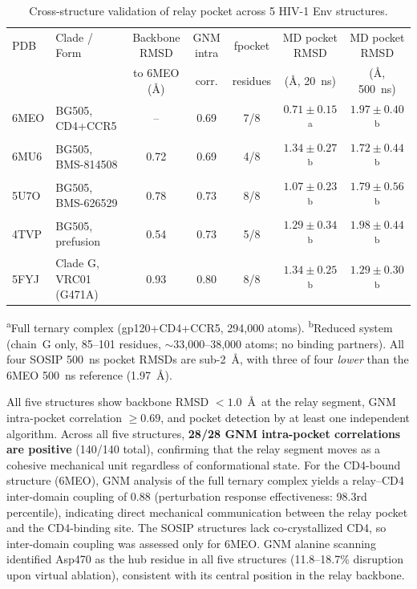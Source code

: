 \documentclass[11pt,a4paper]{article}
\begin{document}
\begin{table}[htbp]
\centering
\caption{Cross-structure validation of relay pocket across 5 HIV-1 Env structures.}
\label{tab:crossval}
\footnotesize
\begin{tabularx}{\textwidth}{@{}l >{\raggedright\arraybackslash}X ccccc@{}}
\toprule
PDB & Clade / Form & Backbone RMSD & GNM intra & fpocket & MD pocket RMSD & MD pocket RMSD \\
& & to 6MEO (\AA) & corr. & residues & (\AA, 20~ns) & (\AA, 500~ns) \\
\midrule
6MEO & BG505, CD4+CCR5 & -- & 0.69 & 7/8 & $0.71 \pm 0.15$\textsuperscript{a} & $1.97 \pm 0.40$\textsuperscript{b} \\
6MU6 & BG505, BMS-814508 & 0.72 & 0.69 & 4/8 & $1.34 \pm 0.27$\textsuperscript{b} & $\mathbf{1.72 \pm 0.44}$\textsuperscript{b} \\
5U7O & BG505, BMS-626529 & 0.78 & 0.73 & 8/8 & $1.07 \pm 0.23$\textsuperscript{b} & $1.79 \pm 0.56$\textsuperscript{b} \\
4TVP & BG505, prefusion & 0.54 & 0.73 & 5/8 & $1.29 \pm 0.34$\textsuperscript{b} & $\mathbf{1.98 \pm 0.44}$\textsuperscript{b} \\
5FYJ & Clade G, VRC01 (G471A) & 0.93 & 0.80 & 8/8 & $1.34 \pm 0.25$\textsuperscript{b} & $\mathbf{1.29 \pm 0.30}$\textsuperscript{b} \\
\bottomrule
\end{tabularx}

\vspace{0.5em}
{\footnotesize \textsuperscript{a}Full ternary complex (gp120+CD4+CCR5, 294,000 atoms). \textsuperscript{b}Reduced system (chain~G only, 85--101 residues, ${\sim}$33,000--38,000 atoms; no binding partners). All four SOSIP 500~ns pocket RMSDs are sub-2~\AA, with three of four \textit{lower} than the 6MEO 500~ns reference (1.97~\AA).}
\end{table}

All five structures show backbone RMSD $<1.0$~\AA\ at the relay segment, GNM intra-pocket correlation $\geq 0.69$, and pocket detection by at least one independent algorithm. Across all five structures, \textbf{28/28 GNM intra-pocket correlations are positive} (140/140 total), confirming that the relay segment moves as a cohesive mechanical unit regardless of conformational state. For the CD4-bound structure (6MEO), GNM analysis of the full ternary complex yields a relay--CD4 inter-domain coupling of 0.88 (perturbation response effectiveness: 98.3rd percentile), indicating direct mechanical communication between the relay pocket and the CD4-binding site. The SOSIP structures lack co-crystallized CD4, so inter-domain coupling was assessed only for 6MEO. GNM alanine scanning identified Asp470 as the hub residue in all five structures (11.8--18.7\% disruption upon virtual ablation), consistent with its central position in the relay backbone.
\end{document}
